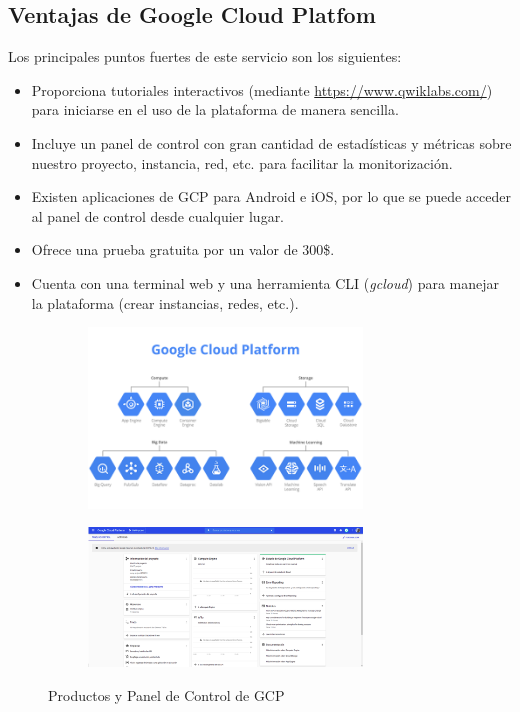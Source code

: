 \documentclass[12pt,spanish]{article}
\begin{document}
\subsection{Ventajas de Google Cloud Platfom}

Los principales puntos fuertes de este servicio son los siguientes:
\begin{itemize}
	\item Proporciona tutoriales interactivos (mediante \href{https://www.qwiklabs.com/}{https://www.qwiklabs.com/}) para iniciarse en el uso de la plataforma de manera sencilla.
	\item Incluye un panel de control con gran cantidad de estadísticas y métricas sobre nuestro proyecto, instancia, red, etc. para facilitar la monitorización.
	\item Existen aplicaciones de GCP para Android e iOS, por lo que se puede acceder al panel de control desde cualquier lugar.
	\item Ofrece una prueba gratuita por un valor de 300\$.
	\item Cuenta con una terminal web y una herramienta CLI (\emph{gcloud}) para manejar la plataforma (crear instancias, redes, etc.).
\end{itemize}

\begin{figure}[H]
  \begin{subfigure}[t]{0.5\textwidth}
    \centering
		\includegraphics[width=0.8\textwidth]{project/gcp_products.png}
  \end{subfigure}
  \hspace{0.5cm}
  \begin{subfigure}[t]{0.5\textwidth}
    \centering
		\includegraphics[width=0.8\textwidth]{project/controlpanel.png}
  \end{subfigure}
	\caption{Productos y Panel de Control de GCP}
\end{figure}
\newpage
\end{document}
